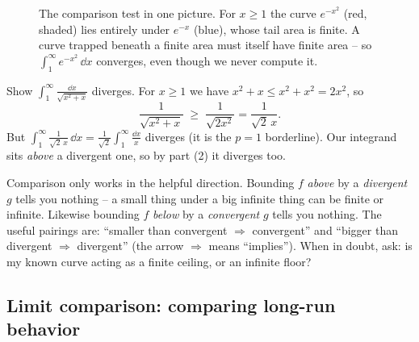 \begin{figure}[H]
\centering
{}
\caption{The comparison test in one picture. For $x\ge 1$ the curve $e^{-x^2}$
(red, shaded) lies entirely under $e^{-x}$ (blue), whose tail area is finite. A
curve trapped beneath a finite area must itself have finite area -- so
$\int_1^\infty e^{-x^2}\,\dd x$ converges, even though we never compute it.}
\label{ch25:fig-comparison}
\end{figure}

\begin{example}
\label{ch25:ex-divcomp}
Show $\displaystyle\int_1^{\infty}\frac{\dd x}{\sqrt{x^2+x}}$ diverges. For
$x\ge 1$ we have $x^2 + x \le x^2 + x^2 = 2x^2$, so
\[
  \frac{1}{\sqrt{x^2+x}} \;\ge\; \frac{1}{\sqrt{2x^2}} = \frac{1}{\sqrt{2}\,x}.
\]
But $\int_1^\infty \frac{1}{\sqrt 2\,x}\,\dd x = \frac{1}{\sqrt2}\int_1^\infty
\frac{\dd x}{x}$ diverges (it is the $p=1$ borderline). Our integrand sits
\emph{above} a divergent one, so by part (2) it diverges too.
\end{example}

\begin{trapbox}
Comparison only works in the helpful direction. Bounding $f$ \emph{above} by a
\emph{divergent} $g$ tells you nothing -- a small thing under a big infinite thing
can be finite or infinite. Likewise bounding $f$ \emph{below} by a \emph{convergent}
$g$ tells you nothing. The useful pairings are: ``smaller than convergent
$\Rightarrow$ convergent'' and ``bigger than divergent $\Rightarrow$ divergent''
(the arrow $\Rightarrow$ means ``implies''). When in doubt, ask: is my
known curve acting as a finite ceiling, or an infinite floor?
\end{trapbox}

\subsection{Limit comparison: comparing long-run behavior}
\label{ch25:limit-comparison}


